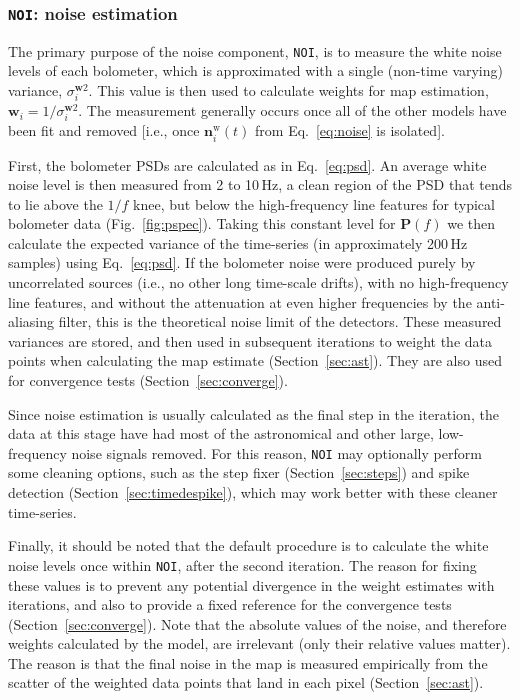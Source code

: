 \documentclass[useAMS,usenatbib,nofootinbib]{mn2e}
\newcommand{\model}[1]{\texttt{#1}}
\begin{document}
\subsubsection{\model{NOI}: noise estimation}
\label{sec:noi}

The primary purpose of the noise component, \model{NOI}, is to measure
the white noise levels of each bolometer, which is approximated with a
single (non-time varying) variance, $\sigma_i^{\mathbf{w}2}$. This
value is then used to calculate weights for map estimation,
$\mathbf{w}_i = 1/\sigma_i^{\mathbf{w}2}$. The measurement generally
occurs once all of the other models have been fit and removed [i.e.,
once $\mathbf{n}^\mathrm{w}_i(t)$ from Eq.~\ref{eq:noise} is
isolated].

First, the bolometer PSDs are calculated as in Eq.~\ref{eq:psd}. An
average white noise level is then measured from 2 to 10\,Hz, a clean
region of the PSD that tends to lie above the $1/f$ knee, but below
the high-frequency line features for typical bolometer data
(Fig.~\ref{fig:pspec}). Taking this constant level for $\mathbf{P}(f)$
we then calculate the expected variance of the time-series (in
approximately 200\,Hz samples) using Eq.~\ref{eq:psd}. If the
bolometer noise were produced purely by uncorrelated sources (i.e., no
other long time-scale drifts), with no high-frequency line features,
and without the attenuation at even higher frequencies by the
anti-aliasing filter, this is the theoretical noise limit of the
detectors. These measured variances are stored, and then used in
subsequent iterations to weight the data points when calculating the
map estimate (Section~\ref{sec:ast}). They are also used for
convergence tests (Section~\ref{sec:converge}).

Since noise estimation is usually calculated as the final step in the
iteration, the data at this stage have had most of the astronomical
and other large, low-frequency noise signals removed. For this reason,
\model{NOI} may optionally perform some cleaning options, such as the
step fixer (Section~\ref{sec:steps}) and spike detection
(Section~\ref{sec:timedespike}), which may work better with these
cleaner time-series.

Finally, it should be noted that the default procedure is to calculate
the white noise levels once within \model{NOI}, after the second
iteration. The reason for fixing these values is to prevent any
potential divergence in the weight estimates with iterations, and also
to provide a fixed reference for the convergence tests
(Section~\ref{sec:converge}). Note that the absolute values of the
noise, and therefore weights calculated by the model, are irrelevant
(only their relative values matter). The reason is that the final
noise in the map is measured empirically from the scatter of the
weighted data points that land in each pixel (Section~\ref{sec:ast}).
\end{document}
